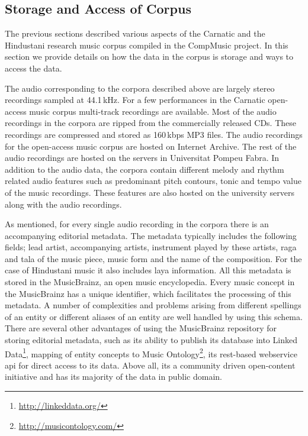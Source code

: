 \subsection{Storage and Access of Corpus}
\label{sec:corpus_storage_and_access}

The previous sections described  various aspects of the Carnatic and the Hindustani research music corpus compiled in the CompMusic project. In this section we provide details on how the data in the corpus is storage and ways to access the data.

The audio corresponding to the corpora described above are largely stereo recordings sampled at 44.1\,kHz. For a few performances in the Carnatic open-access music corpus multi-track recordings are available. Most of the audio recordings in the corpora are ripped from the commercially released CDs. These recordings are compressed and stored as 160\,kbps MP3 files. The audio recordings for the open-access music corpus are hosted on Internet Archive. The rest of the audio recordings are hosted on the servers in Universitat Pompeu Fabra. In addition to the audio data, the corpora contain different melody and rhythm related audio features such as predominant pitch contours, tonic and tempo value of the music recordings. These features are also hosted on the university servers along with the audio recordings.

As mentioned, for every single audio recording in the corpora there is an accompanying editorial metadata. The metadata typically includes the following fields; lead artist, accompanying artists, instrument played by these artists, \gls{raga} and \gls{tala} of the music piece, music form and the name of the composition. For the case of Hindustani music it also includes \gls{laya} information. All this metadata is stored in the MusicBrainz, an open music encyclopedia. Every music concept in the MusicBrainz has a unique identifier, which facilitates the processing of this metadata. A number of complexities and problems arising from different spellings of an entity or different aliases of an entity are well handled by using this schema. There are several other advantages of using the MusicBrainz repository for storing editorial metadata, such as its ability to publish its database into Linked Data\footnote{\url{http://linkeddata.org/}}, mapping of entity concepts to Music Ontology\footnote{\url{http://musicontology.com/}}, its \acrshort{rest}-based webservice \acrshort{api} for direct access to its data. Above all, its a community driven open-content initiative and has its majority of the data in public domain.


